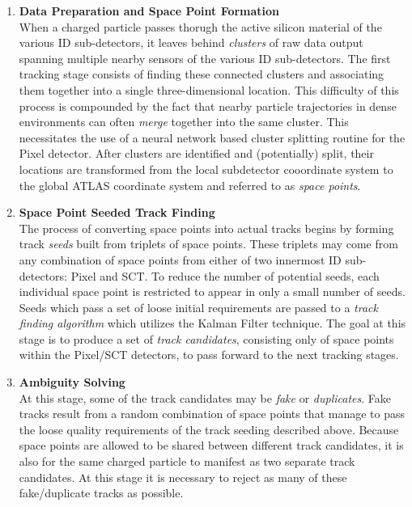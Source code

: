 \begin{enumerate}
    \item \textbf{Data Preparation and Space Point Formation}\\
        When a charged particle passes thorugh the active silicon material of the various ID sub-detectors, it leaves behind \textit{clusters} of 
        raw data output spanning multiple nearby sensors of the various ID sub-detectors.
        The first tracking stage consists of finding these connected clusters and associating them together into a single three-dimensional location.
        This difficulty of this process is compounded by the fact that nearby particle trajectories in dense environments can often \textit{merge} together into the same cluster.
        This necessitates the use of a neural network based cluster splitting routine for the Pixel detector.
        After clusters are identified and (potentially) split, their locations are transformed from the local subdetector cooordinate system to the global ATLAS coordinate system and referred to as \textit{space points}.
    \item \textbf{Space Point Seeded Track Finding}\\
        The process of converting space points into actual tracks begins by forming track \textit{seeds} built from triplets of space points.
        These triplets may come from any combination of space points from either of two innermost ID sub-detectors: Pixel and SCT.
        To reduce the number of potential seeds, each individual space point is restricted to appear in only a small number of seeds.
        Seeds which pass a set of loose initial requirements are passed to a \textit{track finding algorithm} which utilizes the Kalman Filter technique.
        The goal at this stage is to produce a set of \textit{track candidates}, consisting only of space points within the Pixel/SCT detectors, to pass forward to the next tracking stages.
    \item \textbf{Ambiguity Solving}\\
        At this stage, some of the track candidates may be \textit{fake} or \textit{duplicates}.
        Fake tracks result from a random combination of space points that manage to pass the loose quality requirements of the track seeding described above.
        Because space points are allowed to be shared between different track candidates, it is also for the same charged particle to manifest as two separate track candidates.
        At this stage it is necessary to reject as many of these fake/duplicate tracks as possible.

\end{enumerate}
